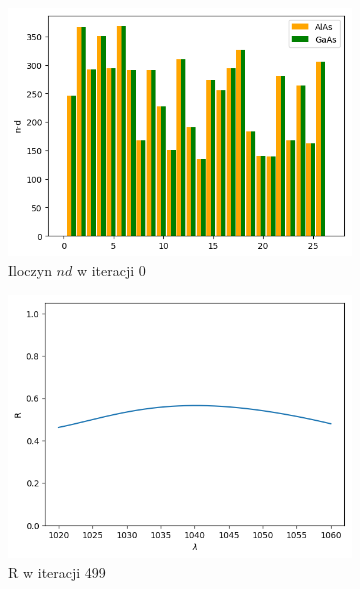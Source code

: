 \begin{figure} [ht!]
\begin{subfigure}[b]{0.32\textwidth}
        \includegraphics[width=\linewidth]{figures/wyniki/1stopien/fcelptp/result_nd0.png}
        \caption{Iloczyn $nd$ w iteracji 0}
    \end{subfigure}
        \begin{subfigure}[b]{0.30\textwidth}
        \includegraphics[width=\linewidth]{figures/wyniki/1stopien/fcelptp/result_R1.png}
        \caption{R w iteracji 499}
    \end{subfigure}
        \begin{subfigure}[b]{0.31\textwidth}

\end{subfigure}
\end{figure}
